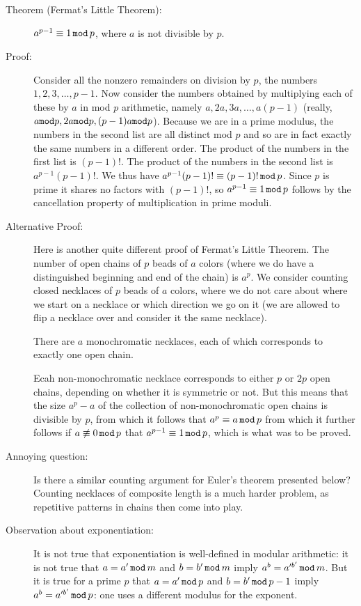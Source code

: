 \documentclass[12pt]{article}
\begin{document}
\begin{description}

\item[Theorem (Fermat's Little Theorem):]  $a^{p-1} \equiv 1\,{\tt mod}\,p$, where $a$ is not divisible by $p$.

\item[ Proof:] Consider all the nonzero remainders on division by $p$, the numbers
$1,2,3,\ldots,p-1$.   Now consider the numbers obtained by multiplying each of these by $a$ in mod $p$ arithmetic,
namely $a,2a,3a,\ldots,a(p-1)$ (really, $a {\tt mod}p, 2a{\tt mod}p, (p-1)a{\tt mod}p$).   Because we are in a prime modulus, the numbers in the second list are all distinct
mod $p$ and so are in fact exactly the same numbers in a different order.   The product of the numbers in the first list is $(p-1)!$.   The product of the numbers in the second list is $a^{p-1}(p-1)!$.  We thus have
$a^{p-1}(p-1)! \equiv (p-1)!\,{\tt mod}\,p$.   Since $p$ is prime it shares no factors with $(p-1)!$,
so $a^{p-1} \equiv 1\,{\tt mod}\,p$ follows by the cancellation property of multiplication in prime moduli.

\item[Alternative Proof:]  Here is another quite different proof of Fermat's Little Theorem.   The number of open chains of $p$ beads of $a$ colors (where we do have a distinguished beginning and end of the chain)
is $a^p$.   We consider counting closed necklaces of $p$ beads of $a$ colors, where we do not care about where we start on a necklace or which direction we go on it (we are allowed to flip a necklace over and consider it the same necklace).

There are $a$ monochromatic necklaces, each of which corresponds to exactly one open chain.

Ecah non-monochromatic necklace corresponds to either $p$ or $2p$ open chains, depending on whether it is symmetric or not.   But this means that the size $a^p-a$ of the collection of non-monochromatic open chains is divisible
by $p$, from which it follows that $a^p \equiv a \,{\tt mod}\,p$ from which it further follows if $a \not\equiv 0\,{\tt mod}\,p$ that $a^{p-1}\equiv 1\,{\tt mod}\,p$, which is what was to be proved.


\item[Annoying question:]  Is there a similar counting argument for Euler's theorem presented below?   Counting necklaces of composite length is a much harder problem, as repetitive patterns in chains then come into play.

\item[Observation about exponentiation:]  It is not true that exponentiation is well-defined in modular arithmetic:  it is not true that $a=a'\,{\tt mod}\,m$
and $b=b'\,{\tt mod}\,m$ imply $a^b=a'^{b'}\,{\tt mod}\,m$.  But it is true for a prime $p$ that $a=a'\,{\tt mod}\,p$
and $b=b'\,{\tt mod}\,p-1$ imply $a^b=a'^{b'}\,{\tt mod}\,p$:  one uses a different modulus for the exponent.

\end{description}
\end{document}
